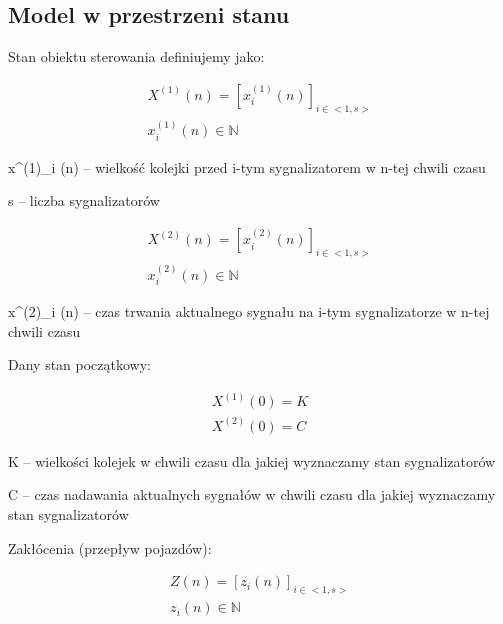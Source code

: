 \subsection{Model w przestrzeni stanu}
Stan obiektu sterowania definiujemy jako:

\begin{equation}
	\begin{array}{c}
		X^{(1)} (n) = [x^{(1)}_{i} (n)]_{i \in <1,s>}\\
		x^{(1)}_{i} (n) \in \mathbb{N}
	\end{array}
\end{equation}

x^{(1)}_{i} (n) \textrm{ -- wielkość kolejki przed i-tym sygnalizatorem w n-tej chwili czasu}

s -- liczba sygnalizatorów

\begin{equation}
	\begin{array}{c}
		X^{(2)} (n) = [x^{(2)}_{i} (n)]_{i \in <1,s>}\\
		x^{(2)}_{i} (n) \in \mathbb{N}
	\end{array}
\end{equation}

x^{(2)}_{i} (n) \textrm{ -- czas trwania aktualnego sygnału na i-tym sygnalizatorze w n-tej chwili czasu}

\vspace{1.5cm}
Dany stan początkowy:

\begin{equation}
	\begin{array}{c}
		X^{(1)} (0) = K\\
		X^{(2)} (0) = C
	\end{array}
\end{equation}

K -- wielkości kolejek w chwili czasu dla jakiej wyznaczamy stan sygnalizatorów

C -- czas nadawania aktualnych sygnałów w chwili czasu dla jakiej wyznaczamy stan sygnalizatorów

\vspace{1.5cm}
Zakłócenia (przepływ pojazdów):

\begin{equation}
	\begin{array}{c}
		Z (n) = [z_{i} (n)]_{i \in <1,s>}\\
		z_{i} (n) \in \mathbb{N}
	\end{array}
\end{equation}

